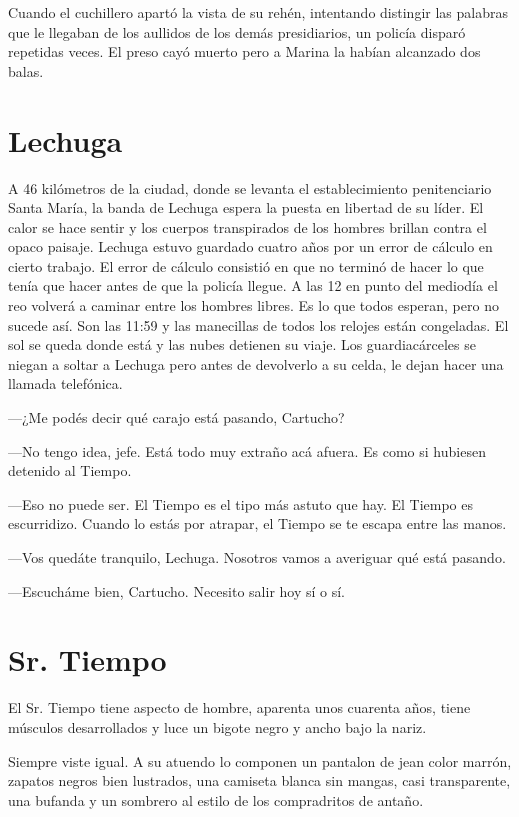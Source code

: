 Cuando el cuchillero apartó la vista de su rehén, intentando distingir las palabras que le llegaban de los aullidos de los demás presidiarios, un policía disparó repetidas veces. El preso cayó muerto pero a Marina la habían alcanzado dos balas.

\chapter*{Lechuga}

A 46 kilómetros de la ciudad, donde se levanta el establecimiento penitenciario Santa María, la banda de Lechuga espera la puesta en libertad de su líder. El calor se hace sentir y los cuerpos transpirados de los hombres brillan contra el opaco paisaje. Lechuga estuvo guardado cuatro años por un error de cálculo en cierto trabajo. El error de cálculo consistió en que no terminó de hacer lo que tenía que hacer antes de que la policía llegue. A las 12 en punto del mediodía el reo volverá a caminar entre los hombres libres. Es lo que todos esperan, pero no sucede así. Son las 11:59 y las manecillas de todos los relojes están congeladas. El sol se queda donde está y las nubes detienen su viaje. Los guardiacárceles se niegan a soltar a Lechuga pero antes de devolverlo a su celda, le dejan hacer una llamada telefónica.

---¿Me podés decir qué carajo está pasando, Cartucho?

---No tengo idea, jefe. Está todo muy extraño acá afuera. Es como si hubiesen detenido al Tiempo.

---Eso no puede ser. El Tiempo es el tipo más astuto que hay. El Tiempo es escurridizo. Cuando lo estás por atrapar, el Tiempo se te escapa entre las manos.

---Vos quedáte tranquilo, Lechuga. Nosotros vamos a averiguar qué está pasando.

---Escucháme bien, Cartucho. Necesito salir hoy sí o sí.

\chapter*{Sr. Tiempo}

El Sr. Tiempo tiene aspecto de hombre, aparenta unos cuarenta años, tiene músculos desarrollados y luce un bigote negro y ancho bajo la nariz.

Siempre viste igual. A su atuendo lo componen un pantalon de jean color marrón, zapatos negros bien lustrados, una camiseta blanca sin mangas, casi transparente, una bufanda y un sombrero al estilo de los compradritos de antaño.

